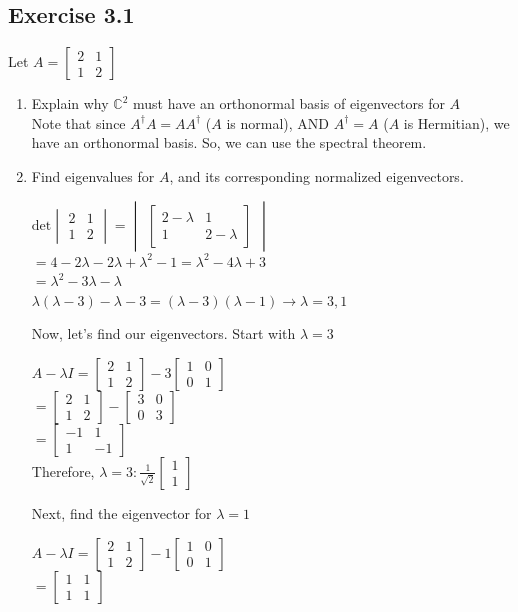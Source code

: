 \documentclass[12pt]{article}
\theoremstyle{plain}
\theoremstyle{nonumberplain}
\theoremstyle{plain}
\theoremstyle{nonumberplain}
\newcommand\1{{\bf 1}}
\newcommand{\bmat}[1]{\begin{bmatrix*} #1 \end{bmatrix*}} %
\newcommand{\C}{\mathbb{C}} %
\newcommand{\<}{\left\langle}
\renewcommand{\>}{\right\rangle}
\begin{document}
\subsection{Exercise 3.1}
Let $A=\bmat{2 & 1 \\ 1 & 2}$
\begin{enumerate}[label=(\alph*)]
\item Explain why $\C^2$ must have an orthonormal basis of eigenvectors for $A$ \\
Note that since $A^\dagger A=AA^\dagger$ ($A$ is normal), AND $A^\dagger=A$ ($A$ is Hermitian), we have an orthonormal basis. So, we can use the spectral theorem.
\item Find eigenvalues for $A$, and its corresponding normalized eigenvectors. \\
\begin{center}
$\text{det} \begin{vmatrix} 2 & 1 \\ 1 & 2 \end{vmatrix}=\begin{vmatrix} \bmat{2-\lambda & 1 \\ 1 & 2-\lambda} \end{vmatrix}$ \\
$=4-2\lambda-2\lambda+\lambda^2-1=\lambda^2-4\lambda+3$ \\
$=\lambda^2-3\lambda-\lambda$ \\
$\lambda(\lambda-3)-\lambda-3=(\lambda-3)(\lambda-1)\longrightarrow\lambda=3,1$
\end{center}
Now, let's find our eigenvectors. Start with $\lambda=3$
\begin{center}
$A-\lambda I=\bmat{2 & 1 \\ 1 & 2}-3\bmat{1 & 0 \\ 0 & 1}$ \\
$=\bmat{2 & 1 \\ 1 & 2}-\bmat{3 & 0 \\ 0 & 3}$ \\
$=\bmat{-1 & 1 \\ 1 & -1}$ \\
Therefore, $\lambda=3:\frac{1}{\sqrt{2}}\bmat{1 \\ 1}$
\end{center}
Next, find the eigenvector for $\lambda=1$
\begin{center}
$A-\lambda I=\bmat{2 & 1 \\ 1 & 2}-1\bmat{1 & 0 \\ 0 & 1}$ \\
$=\bmat{1 & 1 \\ 1 & 1}$ \\

\end{center}
\end{enumerate}
\end{document}
